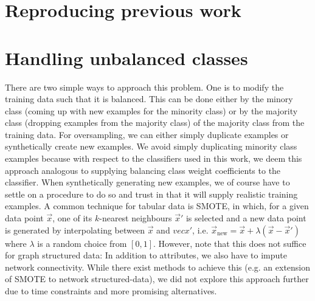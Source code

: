 \documentclass[
	fontsize=10pt, %
	twoside=false, %
	secnumdepth=1, %
]{kaobook}
\begin{document}
\section{Reproducing previous work}



\section{Handling unbalanced classes}


There are two simple ways to approach this problem. One is to modify the
training data such that it is balanced. This can be done either by
 the minory class (coming up with new examples for the
minority class) or by  the majority class (dropping examples
from the majority class) of the majority class from the training data.
%
For oversampling, we can either simply duplicate examples or synthetically
create new examples. We avoid simply duplicating minority class examples because
with respect to the classifiers used in this work, we deem this approach
analogous to supplying balancing class weight coefficients to the classifier.
When synthetically generating new examples, we of course have to settle on a
procedure to do so and trust in that it will supply realistic training examples.
A common technique for tabular data is \textsc{SMOTE}, in which, for a given
data point $\vec x$, one of its $k$-nearest neighbours $\vec x'$ is selected and
a new data point is generated by interpolating between $\vec x$ and $vec x'$,
i.e. $\vec x_{\text{new}} = \vec x + \lambda (\vec x - \vec x')$  where
$\lambda$ is a random choice from $[0,1]$. However, note that this does not
suffice for graph structured data: In addition to attributes, we also have to
impute network connectivity. While there exist methods to achieve this (e.g. an
extension of \textsc{SMOTE} to network structured-data), we did not explore this
approach further due to time constraints and more promising alternatives.
\end{document}

